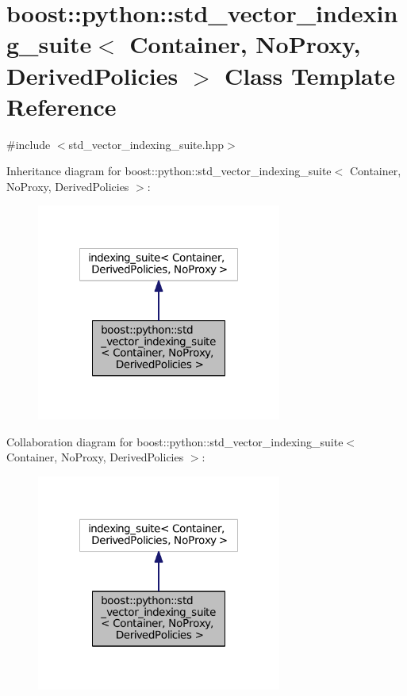 \hypertarget{classboost_1_1python_1_1std__vector__indexing__suite}{\section{boost\-:\-:python\-:\-:std\-\_\-vector\-\_\-indexing\-\_\-suite$<$ Container, No\-Proxy, Derived\-Policies $>$ Class Template Reference}
\label{classboost_1_1python_1_1std__vector__indexing__suite}
}


{\ttfamily \#include $<$std\-\_\-vector\-\_\-indexing\-\_\-suite.\-hpp$>$}



Inheritance diagram for boost\-:\-:python\-:\-:std\-\_\-vector\-\_\-indexing\-\_\-suite$<$ Container, No\-Proxy, Derived\-Policies $>$\-:\nopagebreak
\begin{figure}[H]
\begin{center}
\leavevmode
\includegraphics[width=228pt]{classboost_1_1python_1_1std__vector__indexing__suite__inherit__graph}
\end{center}
\end{figure}


Collaboration diagram for boost\-:\-:python\-:\-:std\-\_\-vector\-\_\-indexing\-\_\-suite$<$ Container, No\-Proxy, Derived\-Policies $>$\-:\nopagebreak
\begin{figure}[H]
\begin{center}
\leavevmode
\includegraphics[width=228pt]{classboost_1_1python_1_1std__vector__indexing__suite__coll__graph}
\end{center}
\end{figure}

